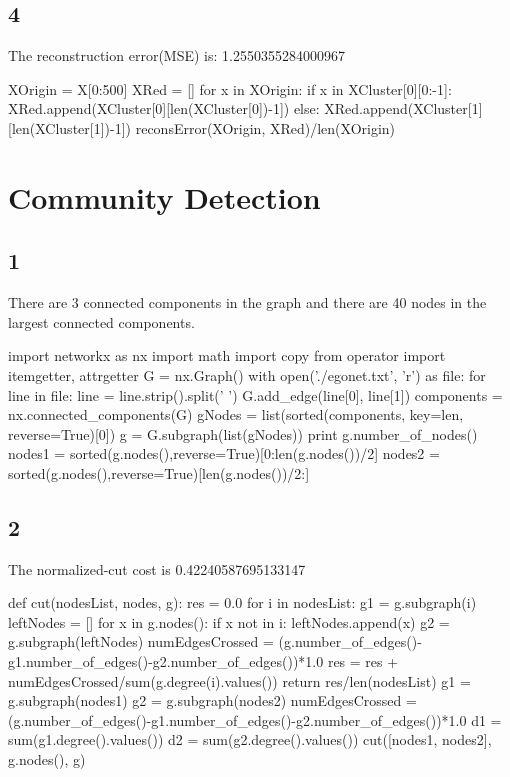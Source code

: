 \documentclass [11pt, a4paper, oneside] {article}
\begin{document}
\subsection *{4}
The reconstruction error(MSE) is: 1.2550355284000967\\
\begin{python}
XOrigin = X[0:500]
XRed = []
for x in XOrigin:
    if x in XCluster[0][0:-1]:
        XRed.append(XCluster[0][len(XCluster[0])-1])
    else:
        XRed.append(XCluster[1][len(XCluster[1])-1])
reconsError(XOrigin, XRed)/len(XOrigin)
\end{python}
\section *{Community Detection}
\subsection *{1}
There are 3 connected components in the graph and there are 40 nodes in the largest connected components.\\
\begin{python}
import networkx as nx
import math
import copy
from operator import itemgetter, attrgetter
G = nx.Graph()
with open('./egonet.txt', 'r') as file:
    for line in file:
        line = line.strip().split(' ')
        G.add_edge(line[0], line[1])
components = nx.connected_components(G)
gNodes = list(sorted(components, key=len, reverse=True)[0])
g = G.subgraph(list(gNodes))
print g.number_of_nodes()
nodes1 = sorted(g.nodes(),reverse=True)[0:len(g.nodes())/2]
nodes2 = sorted(g.nodes(),reverse=True)[len(g.nodes())/2:]
\end{python}
\subsection *{2}
The normalized-cut cost is 0.42240587695133147\\
\begin{python}
def cut(nodesList, nodes, g):
    res = 0.0
    for i in nodesList:
        g1 = g.subgraph(i)
        leftNodes = []
        for x in g.nodes():
            if x not in i:
                leftNodes.append(x)
        g2 = g.subgraph(leftNodes)
        numEdgesCrossed = (g.number_of_edges()-g1.number_of_edges()-g2.number_of_edges())*1.0
        res = res + numEdgesCrossed/sum(g.degree(i).values())
    return res/len(nodesList)
g1 = g.subgraph(nodes1)
g2 = g.subgraph(nodes2)
numEdgesCrossed = (g.number_of_edges()-g1.number_of_edges()-g2.number_of_edges())*1.0
d1 = sum(g1.degree().values())
d2 = sum(g2.degree().values())
cut([nodes1, nodes2], g.nodes(), g)
\end{python}
\end{document}
